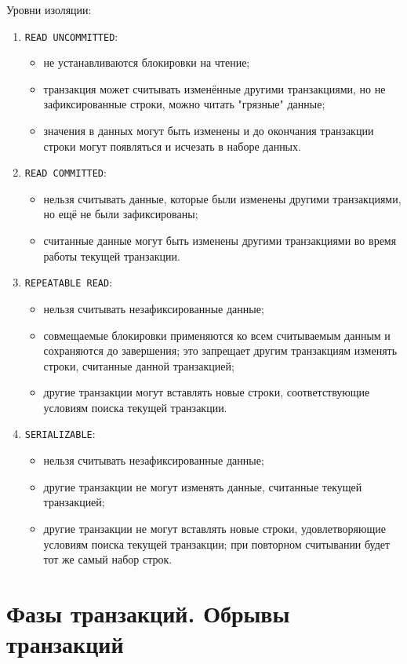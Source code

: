 Уровни изоляции:
\begin{enumerate}
	\item \texttt{READ UNCOMMITTED}:
		\begin{itemize}
			\item не устанавливаются блокировки на чтение;
			\item транзакция может считывать изменённые другими транзакциями, но не зафиксированные строки, \ie можно читать "грязные" данные;
			\item значения в данных могут быть изменены и до окончания транзакции строки могут появляться и исчезать в наборе данных.
		\end{itemize}
	\item \texttt{READ COMMITTED}:
		\begin{itemize}
			\item нельзя считывать данные, которые были изменены другими транзакциями, но ещё не были зафиксированы;
			\item считанные данные могут быть изменены другими транзакциями во время работы текущей транзакции.
		\end{itemize}
	\item \texttt{REPEATABLE READ}:
		\begin{itemize}
			\item нельзя считывать незафиксированные данные;
			\item совмещаемые блокировки применяются ко всем считываемым данным и сохраняются до завершения; это запрещает другим транзакциям изменять строки, считанные данной транзакцией;
			\item другие транзакции могут вставлять новые строки, соответствующие условиям поиска текущей транзакции.
		\end{itemize}
	\item \texttt{SERIALIZABLE}:
		\begin{itemize}
			\item нельзя считывать незафиксированные данные;
			\item другие транзакции не могут изменять данные, считанные текущей транзакцией;
			\item другие транзакции не могут вставлять новые строки, удовлетворяющие условиям поиска текущей транзакции; при повторном считывании будет тот же самый набор строк.
		\end{itemize}
\end{enumerate}

\section{Фазы транзакций. Обрывы транзакций}

